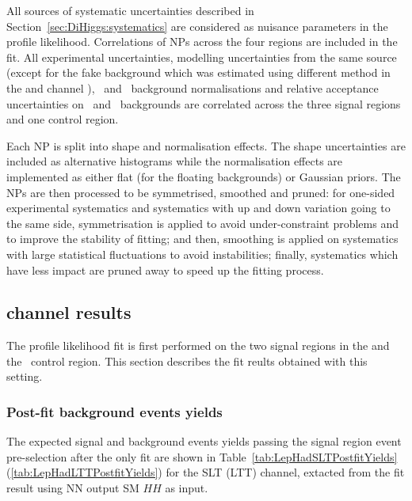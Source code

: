 All sources of systematic uncertainties described in Section~\ref{sec:DiHiggs:systematics} 
are considered as nuisance parameters
in the profile likelihood. 
Correlations of NPs across the four regions are included in the fit.
All experimental uncertainties,
modelling uncertainties from the same source 
(except for the fake background which was estimated using different
method in the \lephad and \hadhad channel ),
\ttbar\ and \ZHF\ background normalisations and 
relative acceptance uncertainties on \ttbar\ and \ZHF\ backgrounds
are correlated across the three signal regions and one control region. 


Each NP is split into shape and normalisation effects. 
The shape uncertainties are included as alternative histograms while the
normalisation effects are implemented as either flat (for the floating backgrounds)
or Gaussian priors. 
The NPs are then processed to be symmetrised, smoothed and pruned:
for one-sided experimental systematics and systematics with up and 
down variation going to the same side, symmetrisation is applied to 
avoid under-constraint problems and to improve the stability of fitting;
and then, smoothing is applied on systematics with large 
statistical fluctuations to avoid instabilities;
finally, systematics which have less impact are pruned away to speed up
the fitting process.






\subsection{\texorpdfstring{\lephad}{lephad} channel results}
\label{sec:DiHiggs:lephadonly}
The profile likelihood fit is first performed on the two signal regions 
in the \lephad and the \ZHF\ control region. 
This section describes the fit reults obtained with this setting. 

\subsubsection{Post-fit background events yields}

The expected signal and background events yields  
passing the signal region event pre-selection after the \lephad only fit 
are shown in Table~\ref{tab:LepHadSLTPostfitYields} 
(\ref{tab:LepHadLTTPostfitYields}) for the SLT (LTT) channel, extacted from the 
fit result using NN output SM $HH$ as input. 



